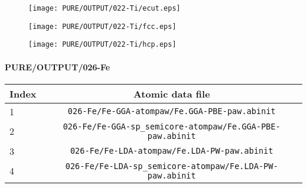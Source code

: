 \documentclass[onecolumn]{revtex4}
\begin{document}
\begin{figure}[h] 
\centering 
\texttt{[image: PURE/OUTPUT/022-Ti/ecut.eps]}
\end{figure}
\begin{figure}[h] 
\centering 
\texttt{[image: PURE/OUTPUT/022-Ti/fcc.eps]}
\end{figure}
\begin{figure}[h] 
\centering 
\texttt{[image: PURE/OUTPUT/022-Ti/hcp.eps]}
\end{figure}
\newpage
\paragraph*{\bf{PURE/OUTPUT/026-Fe}}
\begin{center}
\begin{tabular}{lc}
\hline
Index & Atomic data file \\
\hline
1 & \verb?026-Fe/Fe-GGA-atompaw/Fe.GGA-PBE-paw.abinit?\\
2 & \verb?026-Fe/Fe-GGA-sp_semicore-atompaw/Fe.GGA-PBE-paw.abinit?\\
3 & \verb?026-Fe/Fe-LDA-atompaw/Fe.LDA-PW-paw.abinit?\\
4 & \verb?026-Fe/Fe-LDA-sp_semicore-atompaw/Fe.LDA-PW-paw.abinit?\\
\hline
\end{tabular}
\end{center}
\end{document}
